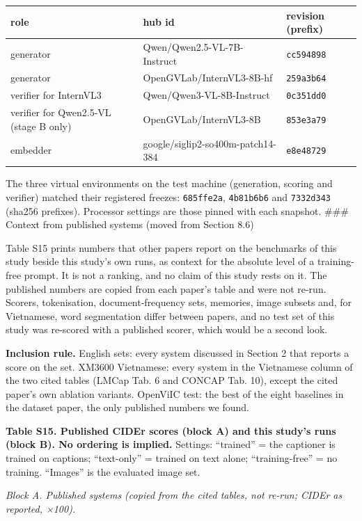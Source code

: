 \documentclass[manuscript,screen]{acmart}
\begin{document}
\begin{longtable}[]{@{}lll@{}}
\toprule\noalign{}
role & hub id & revision (prefix) \\
\midrule\noalign{}
\endhead
\bottomrule\noalign{}
\endlastfoot
generator & Qwen/Qwen2.5-VL-7B-Instruct & \texttt{cc594898} \\
generator & OpenGVLab/InternVL3-8B-hf & \texttt{259a3b64} \\
verifier for InternVL3 & Qwen/Qwen3-VL-8B-Instruct & \texttt{0c351dd0} \\
verifier for Qwen2.5-VL (stage B only) & OpenGVLab/InternVL3-8B & \texttt{853e3a79} \\
embedder & google/siglip2-so400m-patch14-384 & \texttt{e8e48729} \\
\end{longtable}

The three virtual environments on the test machine (generation, scoring and verifier) matched their
registered freezes: \texttt{685ffe2a}, \texttt{4b81b6b6} and \texttt{7332d343} (sha256 prefixes).
Processor settings are those pinned with each snapshot. \#\#\# Context from published systems (moved
from Section 8.6)

Table S15 prints numbers that other papers report on the benchmarks of this study beside this
study's own runs, as context for the absolute level of a training-free prompt. It is not a ranking,
and no claim of this study rests on it. The published numbers are copied from each paper's table and
were not re-run. Scorers, tokenisation, document-frequency sets, memories, image subsets and, for
Vietnamese, word segmentation differ between papers, and no test set of this study was re-scored
with a published scorer, which would be a second look.

\textbf{Inclusion rule.} English sets: every system discussed in Section 2 that reports a score on
the set. XM3600 Vietnamese: every system in the Vietnamese column of the two cited tables (LMCap
Tab. 6 and CONCAP Tab. 10), except the cited paper's own ablation variants. OpenViIC test: the best
of the eight baselines in the dataset paper, the only published numbers we found.

\textbf{Table S15. Published CIDEr scores (block A) and this study's runs (block B). No ordering is
implied.} Settings: ``trained'' = the captioner is trained on captions; ``text-only'' = trained on
text alone; ``training-free'' = no training. ``Images'' is the evaluated image set.

\emph{Block A. Published systems (copied from the cited tables, not re-run; CIDEr as reported,
×100).}
\end{document}
